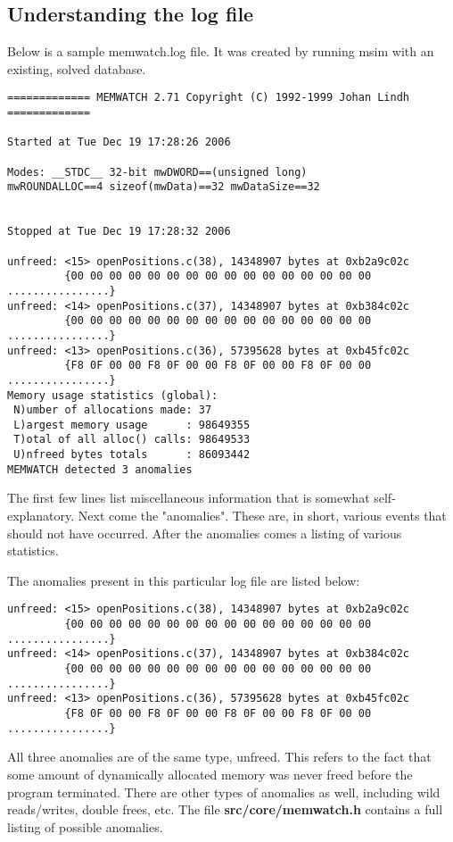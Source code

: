 \documentclass[11pt]{article}
\begin{document}
\subsection{Understanding the log file}
Below is a sample memwatch.log file. It was created by running msim with an existing, solved database.
\begin{verbatim}
============= MEMWATCH 2.71 Copyright (C) 1992-1999 Johan Lindh =============

Started at Tue Dec 19 17:28:26 2006

Modes: __STDC__ 32-bit mwDWORD==(unsigned long)
mwROUNDALLOC==4 sizeof(mwData)==32 mwDataSize==32


Stopped at Tue Dec 19 17:28:32 2006

unfreed: <15> openPositions.c(38), 14348907 bytes at 0xb2a9c02c
         {00 00 00 00 00 00 00 00 00 00 00 00 00 00 00 00 ................}
unfreed: <14> openPositions.c(37), 14348907 bytes at 0xb384c02c
         {00 00 00 00 00 00 00 00 00 00 00 00 00 00 00 00 ................}
unfreed: <13> openPositions.c(36), 57395628 bytes at 0xb45fc02c
         {F8 0F 00 00 F8 0F 00 00 F8 0F 00 00 F8 0F 00 00 ................}
Memory usage statistics (global):
 N)umber of allocations made: 37
 L)argest memory usage      : 98649355
 T)otal of all alloc() calls: 98649533
 U)nfreed bytes totals      : 86093442
MEMWATCH detected 3 anomalies
\end{verbatim}

The first few lines list miscellaneous information that is somewhat self-explanatory. Next come the "anomalies". These are, in short, various events that should not have occurred. After the anomalies comes a listing of various statistics.

The anomalies present in this particular log file are listed below:

\begin{verbatim}
unfreed: <15> openPositions.c(38), 14348907 bytes at 0xb2a9c02c
         {00 00 00 00 00 00 00 00 00 00 00 00 00 00 00 00 ................}
unfreed: <14> openPositions.c(37), 14348907 bytes at 0xb384c02c
         {00 00 00 00 00 00 00 00 00 00 00 00 00 00 00 00 ................}
unfreed: <13> openPositions.c(36), 57395628 bytes at 0xb45fc02c
         {F8 0F 00 00 F8 0F 00 00 F8 0F 00 00 F8 0F 00 00 ................}
\end{verbatim}

All three anomalies are of the same type, unfreed. This refers to the fact that some amount of dynamically allocated memory was never freed before the program terminated. There are other types of anomalies as well, including wild reads/writes, double frees, etc. The file \textbf{src/core/memwatch.h} contains a full listing of possible anomalies.
\end{document}
